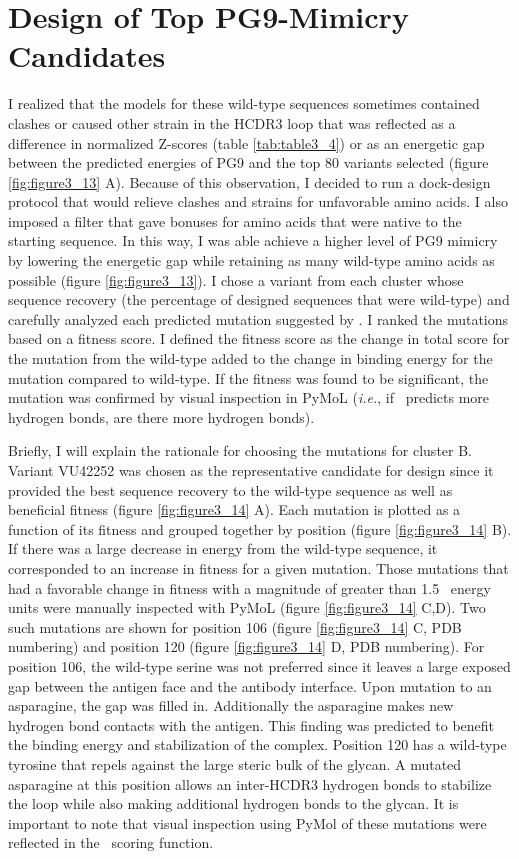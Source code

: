 \section{Design of Top PG9-Mimicry Candidates}
I realized that the models for these wild-type sequences sometimes contained clashes or caused other strain in the HCDR3 loop that was reflected as a difference in normalized Z-scores (table \ref{tab:table3_4}) or as an energetic gap between the predicted energies of PG9 and the top 80 variants selected (figure \ref{fig:figure3_13} A). Because of this observation, I decided to run a dock-design protocol that would relieve clashes and strains for unfavorable amino acids. I also imposed a filter that gave bonuses for amino acids that were native to the starting sequence. In this way, I was able achieve a higher level of PG9 mimicry by lowering the energetic gap while retaining as many wild-type amino acids as possible (figure \ref{fig:figure3_13}). I chose a variant from each cluster whose sequence recovery (the percentage of designed sequences that were wild-type) and carefully analyzed each predicted mutation suggested by \rosetta. I ranked the mutations based on a fitness score. I defined the fitness score as the change in total score for the mutation from the wild-type added to the change in binding energy for the mutation compared to wild-type. If the fitness was found to be significant, the mutation was confirmed by visual inspection in PyMoL (\textit{i.e.}, if \rosetta~predicts more hydrogen bonds, are there more hydrogen bonds).

Briefly, I will explain the rationale for choosing the mutations for cluster B. Variant VU42252 was chosen as the representative candidate for design since it provided the best sequence recovery to the wild-type sequence as well as beneficial fitness (figure \ref{fig:figure3_14} A). Each mutation is plotted as a function of its fitness and grouped together by position (figure \ref{fig:figure3_14} B). If there was a large decrease in energy from the wild-type sequence, it corresponded to an increase in fitness for a given mutation. Those mutations that had a favorable change in fitness with a magnitude of greater than 1.5 \rosetta~energy units were manually inspected with PyMoL (figure \ref{fig:figure3_14} C,D). Two such mutations are shown for position 106 (figure \ref{fig:figure3_14} C, PDB numbering) and position 120 (figure \ref{fig:figure3_14} D, PDB numbering). For position 106, the wild-type serine was not preferred since it leaves a large exposed gap between the antigen face and the antibody interface. Upon mutation to an asparagine, the gap was filled in. Additionally the asparagine makes new hydrogen bond contacts with the antigen. This finding was predicted to benefit the binding energy and stabilization of the complex. Position 120 has a wild-type tyrosine that repels against the large steric bulk of the glycan. A mutated asparagine at this position allows an inter-HCDR3 hydrogen bonds to stabilize the loop while also making additional hydrogen bonds to the glycan. It is important to note that visual inspection using PyMol of these mutations were reflected in the \rosetta~scoring function.

